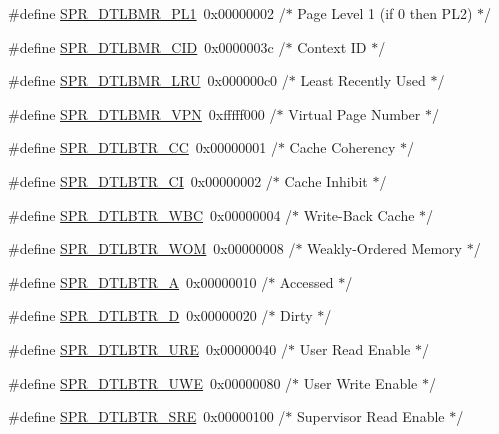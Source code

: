 \begin{DoxyCompactItemize}
\#define \hyperlink{spr-defs_8h_a95ef125d76ca12eaf08ff91e71efa511}{\-S\-P\-R\-\_\-\-D\-T\-L\-B\-M\-R\-\_\-\-P\-L1}~0x00000002  /$\ast$ Page Level 1 (if 0 then P\-L2) $\ast$/
\item 
\#define \hyperlink{spr-defs_8h_ab97e1607bf6d66a4fa3485a95d831c93}{\-S\-P\-R\-\_\-\-D\-T\-L\-B\-M\-R\-\_\-\-C\-I\-D}~0x0000003c  /$\ast$ Context I\-D $\ast$/
\item 
\#define \hyperlink{spr-defs_8h_a9f1afecdc7246525901671b719f04034}{\-S\-P\-R\-\_\-\-D\-T\-L\-B\-M\-R\-\_\-\-L\-R\-U}~0x000000c0  /$\ast$ Least Recently Used $\ast$/
\item 
\#define \hyperlink{spr-defs_8h_a04cc0cad0672493176fc6b29a3b792fd}{\-S\-P\-R\-\_\-\-D\-T\-L\-B\-M\-R\-\_\-\-V\-P\-N}~0xfffff000  /$\ast$ Virtual Page Number $\ast$/
\item 
\#define \hyperlink{spr-defs_8h_a8814cd7da20e3111461c7951acd8a6eb}{\-S\-P\-R\-\_\-\-D\-T\-L\-B\-T\-R\-\_\-\-C\-C}~0x00000001  /$\ast$ Cache Coherency $\ast$/
\item 
\#define \hyperlink{spr-defs_8h_ac48baabe2f276d4316393b2587cae4c8}{\-S\-P\-R\-\_\-\-D\-T\-L\-B\-T\-R\-\_\-\-C\-I}~0x00000002  /$\ast$ Cache Inhibit $\ast$/
\item 
\#define \hyperlink{spr-defs_8h_a1bcf10fe1ec31b79a998892eea8725e4}{\-S\-P\-R\-\_\-\-D\-T\-L\-B\-T\-R\-\_\-\-W\-B\-C}~0x00000004  /$\ast$ Write-\/\-Back Cache $\ast$/
\item 
\#define \hyperlink{spr-defs_8h_a393fa8a7f705d3cac89d52ffdd47bf00}{\-S\-P\-R\-\_\-\-D\-T\-L\-B\-T\-R\-\_\-\-W\-O\-M}~0x00000008  /$\ast$ Weakly-\/\-Ordered Memory $\ast$/
\item 
\#define \hyperlink{spr-defs_8h_a2f928cac29231788e954eb43e1da97cb}{\-S\-P\-R\-\_\-\-D\-T\-L\-B\-T\-R\-\_\-\-A}~0x00000010  /$\ast$ Accessed $\ast$/
\item 
\#define \hyperlink{spr-defs_8h_a4898566571e39655123c918c42459c25}{\-S\-P\-R\-\_\-\-D\-T\-L\-B\-T\-R\-\_\-\-D}~0x00000020  /$\ast$ Dirty $\ast$/
\item 
\#define \hyperlink{spr-defs_8h_af3d7338d41e4ab58994db44b323c11f8}{\-S\-P\-R\-\_\-\-D\-T\-L\-B\-T\-R\-\_\-\-U\-R\-E}~0x00000040  /$\ast$ User Read Enable $\ast$/
\item 
\#define \hyperlink{spr-defs_8h_ac3b3af7d42636f4d706a2cca6e3ae9a8}{\-S\-P\-R\-\_\-\-D\-T\-L\-B\-T\-R\-\_\-\-U\-W\-E}~0x00000080  /$\ast$ User Write Enable $\ast$/
\item 
\#define \hyperlink{spr-defs_8h_ac848f8ce047cf7eb581b6f054c819a05}{\-S\-P\-R\-\_\-\-D\-T\-L\-B\-T\-R\-\_\-\-S\-R\-E}~0x00000100  /$\ast$ Supervisor Read Enable $\ast$/

\end{DoxyCompactItemize}
